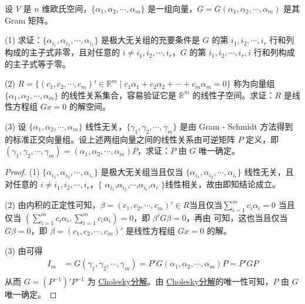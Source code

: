 \documentclass[../../main.tex]{subfiles}%
\begin{document}
\begin{proposition}\label{proposition:例9.36}
设 \(V\) 是 \(n\) 维欧氏空间，\(\{\alpha_1,\alpha_2,\cdots,\alpha_m\}\) 是一组向量，\(G = G(\alpha_1,\alpha_2,\cdots,\alpha_m)\) 是其 Gram 矩阵。

(1) 求证：\(\{\alpha_{i_1},\alpha_{i_2},\cdots,\alpha_{i_r}\}\) 是极大无关组的充要条件是 \(G\) 的第 \(i_1,i_2,\cdots,i_r\) 行和列构成的主子式非零，且对任意的 \(i\neq i_1,i_2,\cdots,i_r\)，\(G\) 的第 \(i_1,i_2,\cdots,i_r,i\) 行和列构成的主子式等于零。

(2) \(R = \{(c_1,c_2,\cdots,c_m)'\in\mathbb{R}^m\mid c_1\alpha_1 + c_2\alpha_2 + \cdots + c_m\alpha_m = 0\}\) 称为向量组 \(\{\alpha_1,\alpha_2,\cdots,\alpha_m\}\) 的线性关系集合，容易验证它是 \(\mathbb{R}^m\) 的线性子空间。求证：\(R\) 是线性方程组 \(Gx = 0\) 的解空间。

(3) 设 \(\{\alpha_1,\alpha_2,\cdots,\alpha_m\}\) 线性无关，\(\{\gamma_1,\gamma_2,\cdots,\gamma_m\}\) 是由 Gram - Schmidt 方法得到的标准正交向量组。设上述两组向量之间的线性关系由可逆矩阵 \(P\) 定义，即 \((\gamma_1,\gamma_2,\cdots,\gamma_m)=(\alpha_1,\alpha_2,\cdots,\alpha_m)P\)，求证：\(P\) 由 \(G\) 唯一确定。
\end{proposition}
\begin{proof}
(1) \(\{\alpha_{i_1},\alpha_{i_2},\cdots,\alpha_{i_r}\}\) 是极大无关组当且仅当 \(\{\alpha_{i_1},\alpha_{i_2},\cdots,\alpha_{i_r}\}\) 线性无关，且对任意的 $i\neq i_1,i_2,\cdots,i_r$，$\{$ $\alpha_{i_1}$,$\alpha_{i_2}$,$\cdots$,$\alpha_{i_r}$,$\alpha_i$ $\}$线性相关，故由即知结论成立。

(2) 由内积的正定性可知，\(\beta=(c_1,c_2,\cdots,c_m)'\in R\)当且仅当$\sum_{i = 1}^{m}c_i\alpha_i=0$ 当且仅当 \((\sum_{i = 1}^{m}c_i\alpha_i,\sum_{i = 1}^{m}c_i\alpha_i)=0\)，即 \(\beta'G\beta = 0\)，再由 可知，这也当且仅当 \(G\beta = 0\)，即 \(\beta=(c_1,c_2,\cdots,c_m)'\) 是线性方程组 \(Gx = 0\) 的解。 

(3) 由可得
\begin{align*}
I_m &= G(\gamma_1,\gamma_2,\cdots,\gamma_m)=P'G(\alpha_1,\alpha_2,\cdots,\alpha_m)P = P'GP\\
\end{align*}
从而 \(G=(P^{-1})'P^{-1}\) 为 \hyperref[proposition:正定阵的3个充要条件]{Cholesky分解}。由 \hyperref[proposition:正定阵的3个充要条件]{Cholesky分解}的唯一性可知，\(P\) 由 \(G\) 唯一确定。
\end{proof}
\end{document}
